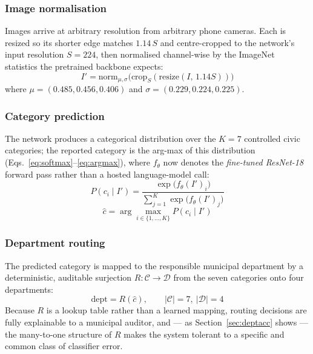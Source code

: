 \documentclass[conference]{IEEEtran}
\begin{document}
\subsubsection{Image normalisation}
Images arrive at arbitrary resolution from arbitrary phone cameras. Each is resized so its shorter edge matches $1.14\,S$ and centre-cropped to the network's input resolution $S = 224$, then normalised channel-wise by the ImageNet statistics the pretrained backbone expects:
\begin{equation}
I' = \mathrm{norm}_{\mu,\sigma}\big(\mathrm{crop}_{S}(\mathrm{resize}(I,\, 1.14S))\big)
\label{eq:resize}
\end{equation}
where $\mu = (0.485, 0.456, 0.406)$ and $\sigma = (0.229, 0.224, 0.225)$.

\subsubsection{Category prediction}
The network produces a categorical distribution over the $K=7$ controlled civic categories; the reported category is the arg-max of this distribution (Eqs.~\ref{eq:softmax}--\ref{eq:argmax}), where $f_\theta$ now denotes the \emph{fine-tuned ResNet-18} forward pass rather than a hosted language-model call:
\begin{equation}
P(c_i \mid I') = \frac{\exp\big(f_\theta(I')_i\big)}{\sum_{j=1}^{K}\exp\big(f_\theta(I')_j\big)}
\label{eq:softmax}
\end{equation}
\begin{equation}
\hat{c} = \arg\max_{i \in \{1,\dots,K\}} P(c_i \mid I')
\label{eq:argmax}
\end{equation}

\subsubsection{Department routing}
The predicted category is mapped to the responsible municipal department by a deterministic, auditable surjection $R: \mathcal{C} \rightarrow \mathcal{D}$ from the seven categories onto four departments:
\begin{equation}
\mathrm{dept} = R(\hat{c}), \qquad |\mathcal{C}| = 7,\ |\mathcal{D}| = 4
\label{eq:routing}
\end{equation}
Because $R$ is a lookup table rather than a learned mapping, routing decisions are fully explainable to a municipal auditor, and --- as Section~\ref{sec:deptacc} shows --- the many-to-one structure of $R$ makes the system tolerant to a specific and common class of classifier error.
\end{document}
